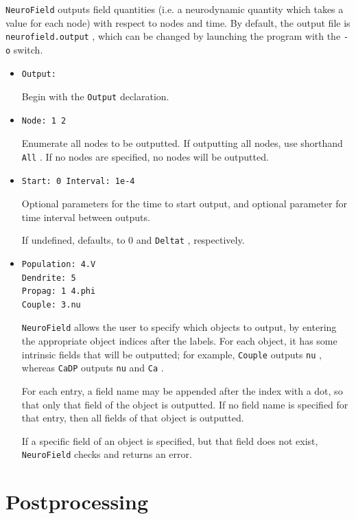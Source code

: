 \documentclass[12pt,a4paper]{article}
\newcommand{\type}[1]{ {\small\small\tt #1} }
\newcommand{\NF}[0]{ \type{NeuroField}}
\begin{document}
\NF outputs field quantities (i.e. a neurodynamic quantity which takes a value for each node) with respect to nodes and time. By default, the output file is \type{neurofield.output}, which can be changed by launching the program with the \type{-o} switch.

\begin{itemize}
	\item \begin{lstlisting}
Output:
		\end{lstlisting}
Begin with the \type{Output} declaration.
\item \begin{lstlisting}
Node: 1 2
\end{lstlisting}
Enumerate all nodes to be outputted. If outputting all nodes, use shorthand \type{All}. If no nodes are specified, no nodes will be outputted.
\item \begin{lstlisting}
Start: 0 Interval: 1e-4
\end{lstlisting}
Optional parameters for the time to start output, and optional parameter for time interval between outputs.

If undefined, defaults, to 0 and \type{Deltat}, respectively.
\item \begin{lstlisting}
Population: 4.V
Dendrite: 5
Propag: 1 4.phi
Couple: 3.nu
\end{lstlisting}

\NF allows the user to specify which objects to output, by entering the appropriate object indices after the labels. For each object, it has some intrinsic fields that will be outputted; for example, \type{Couple} outputs \type{nu}, whereas \type{CaDP} outputs \type{nu} and \type{Ca}.

For each entry, a field name may be appended after the index with a dot, so that only that field of the object is outputted. If no field name is specified for that entry, then all fields of that object is outputted.

If a specific field of an object is specified, but that field does not exist, \NF checks and returns an error.

\end{itemize}

\section{Postprocessing}
\label{sec:postprocessing}
\end{document}
